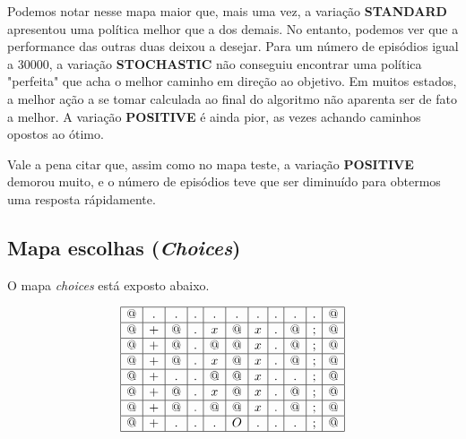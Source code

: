 \documentclass{article}
\begin{document}
Podemos notar nesse mapa maior que, mais uma vez, a variação \textbf{STANDARD} apresentou uma política melhor que a dos demais. No entanto, podemos ver que a performance das outras duas deixou a desejar. Para um número de episódios igual a 30000, a variação
\textbf{STOCHASTIC} não conseguiu encontrar uma política "perfeita" que acha o melhor caminho em direção ao objetivo. Em muitos estados, a melhor ação a se tomar calculada ao final do algoritmo não aparenta ser de fato a melhor. A variação
\textbf{POSITIVE} é ainda pior, as vezes achando caminhos opostos ao ótimo.

Vale a pena citar que, assim como no mapa teste, a variação \textbf{POSITIVE} demorou muito, e o número de episódios teve que ser diminuído
para obtermos uma resposta rápidamente.

\subsection{Mapa escolhas (\textit{Choices})}

O mapa \textit{choices} está exposto abaixo.

\begin{center}
	\[
		\begin{array}{|c|c|c|c|c|c|c|c|c|c|c|}
			\hline
			@ & . & . & . & . & . & . & . & . & . & @ \\ \hline
			@ & + & @ & . & x & @ & x & . & @ & ; & @ \\ \hline
			@ & + & @ & . & @ & @ & x & . & @ & ; & @ \\ \hline
			@ & + & @ & . & x & @ & x & . & @ & ; & @ \\ \hline
			@ & + & . & . & @ & @ & x & . & . & ; & @ \\ \hline
			@ & + & @ & . & x & @ & x & . & @ & ; & @ \\ \hline
			@ & + & @ & . & @ & @ & x & . & @ & ; & @ \\ \hline
			@ & + & . & . & . & O & . & . & . & ; & @ \\ \hline
		\end{array}
	\]
\end{center}


\vspace{10pt}
\end{document}
